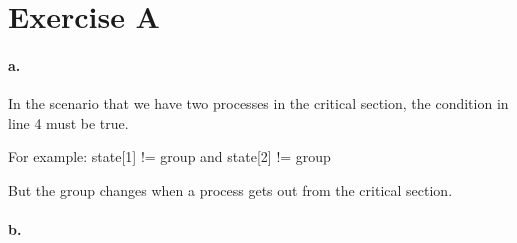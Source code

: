\section*{Exercise A}

\paragraph{a.}
In the scenario that we have two processes in the critical section, 
the condition in line 4 must be true.

For example: state[1] != group and state[2] != group

But the group changes when a process gets out from the critical
section.

\paragraph{b.}

